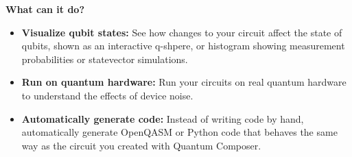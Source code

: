\textbf{What can it do?}\\
\begin{itemize}
    \item \textbf{Visualize qubit states:} See how changes to your circuit affect the state of qubits, shown as an interactive q-shpere, or histogram showing measurement probabilities or statevector simulations.
    \item \textbf{Run on quantum hardware:} Run your circuits on real quantum hardware to understand the effects of device noise.
    \item \textbf{Automatically generate code:} Instead of writing code by hand, automatically generate OpenQASM or Python code that behaves the same way as the circuit you created with Quantum Composer.
\end{itemize}

